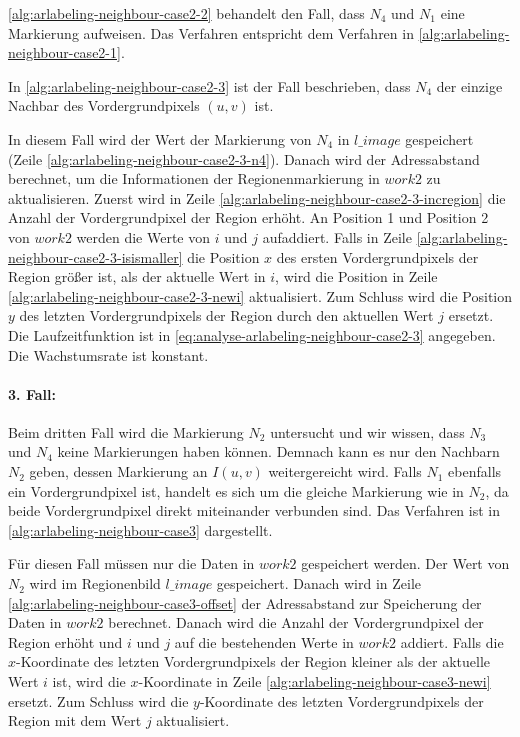 \autoref{alg:arlabeling-neighbour-case2-2} behandelt den Fall, dass $N_4$ und $N_1$ eine Markierung aufweisen. Das Verfahren entspricht dem Verfahren in \autoref{alg:arlabeling-neighbour-case2-1}.


In \autoref{alg:arlabeling-neighbour-case2-3} ist der Fall beschrieben, dass $N_4$ der einzige Nachbar des
 Vordergrundpixels $(u,v)$ ist.

In diesem Fall wird der Wert der Markierung von $N_4$ in $\mathit{l\_image}$ gespeichert
 (Zeile \ref{alg:arlabeling-neighbour-case2-3-n4}). Danach wird der Adressabstand berechnet, um die Informationen der
 Regionenmarkierung in $\mathit{work2}$ zu aktualisieren. Zuerst wird in Zeile
 \ref{alg:arlabeling-neighbour-case2-3-incregion} die Anzahl der Vordergrundpixel der Region erhöht. An Position 1 und
 Position 2 von $\mathit{work2}$ werden die Werte von $i$ und $j$ aufaddiert. Falls in Zeile
 \ref{alg:arlabeling-neighbour-case2-3-isismaller} die Position $x$ des ersten Vordergrundpixels der Region größer ist,
 als der aktuelle Wert in $i$, wird die Position in Zeile \ref{alg:arlabeling-neighbour-case2-3-newi} aktualisiert. Zum
 Schluss wird die Position $y$ des letzten Vordergrundpixels der Region durch den aktuellen Wert $j$ ersetzt. Die
 Laufzeitfunktion ist in \autoref{eq:analyse-arlabeling-neighbour-case2-3} angegeben. Die Wachstumsrate ist konstant.



\paragraph{3. Fall:} %
\label{par:fall_3_}
Beim dritten Fall wird die Markierung $N_2$ untersucht und wir wissen, dass $N_3$ und $N_4$ keine Markierungen haben
 können. Demnach kann es nur den Nachbarn $N_2$ geben, dessen Markierung an $I(u,v)$ weitergereicht wird. Falls $N_1$
 ebenfalls ein Vordergrundpixel ist, handelt es sich um die gleiche Markierung wie in $N_2$, da beide Vordergrundpixel
 direkt miteinander verbunden sind. Das Verfahren ist in \autoref{alg:arlabeling-neighbour-case3} dargestellt.



Für diesen Fall müssen nur die Daten in $\mathit{work2}$ gespeichert werden. Der Wert von $N_2$ wird im Regionenbild
 $\mathit{l\_image}$ gespeichert. Danach wird in Zeile \ref{alg:arlabeling-neighbour-case3-offset} der Adressabstand
 zur Speicherung der Daten in $\mathit{work2}$ berechnet. Danach wird die Anzahl der Vordergrundpixel der Region erhöht
 und $i$ und $j$ auf die bestehenden Werte in $\mathit{work2}$ addiert. Falls die $x$-Koordinate des letzten
 Vordergrundpixels der Region kleiner als der aktuelle Wert $i$ ist, wird die $x$-Koordinate in Zeile
 \ref{alg:arlabeling-neighbour-case3-newi} ersetzt. Zum Schluss wird die $y$-Koordinate des letzten Vordergrundpixels
 der Region mit dem Wert $j$ aktualisiert.

